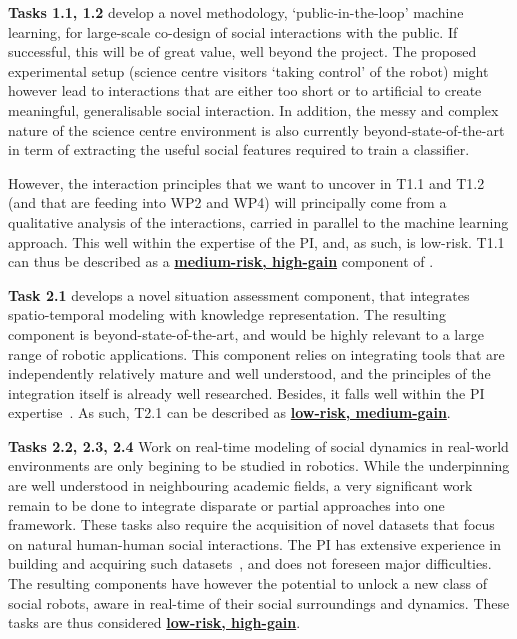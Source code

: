 \begin{rewrite}

\textbf{Tasks 1.1, 1.2} develop a novel methodology, `public-in-the-loop' machine
learning, for large-scale co-design of social interactions with the public. If
successful, this will be of great value, well beyond the project. The
proposed experimental setup (science centre visitors `taking control' of the robot)
might however lead to interactions that are either too short or to artificial to
create meaningful, generalisable social interaction. In addition, the messy and
complex nature of the science centre environment is also currently beyond-state-of-the-art
in term of extracting the useful social features required to train a classifier.

However, the interaction principles that we want to uncover in T1.1 and T1.2
(and that are feeding into WP2 and WP4) will principally come from a qualitative
analysis of the interactions, carried in parallel to the machine learning
approach. This well within the expertise of the PI, and, as such, is low-risk.
T1.1 can thus be described as a \ul{\bf medium-risk, high-gain} component of
\project.

\vspace{1em}

\textbf{Task 2.1} develops a novel situation assessment component, that
integrates spatio-temporal modeling with knowledge representation. The resulting
component is beyond-state-of-the-art, and would be highly relevant to a large range
of robotic applications. This component relies on integrating tools that are
independently relatively mature and well understood, and the principles of the
integration itself is already well researched. Besides, it falls well within the
PI
expertise~\cite{lemaignan2018underworlds,sallami2019simulation,lemaignan2010oro}.
As such, T2.1 can be described as \ul{\bf low-risk, medium-gain}.

\textbf{Tasks 2.2, 2.3, 2.4} Work on real-time modeling of social dynamics in
real-world environments are only begining to be studied in robotics. While the
underpinning are well understood in neighbouring academic fields, a very
significant work remain to be done to integrate disparate or partial approaches
into one framework. These tasks also require the acquisition of novel datasets
that focus on natural human-human social interactions. The PI has extensive
experience in building and acquiring such
datasets~\cite{lemaignan2018pinsoro,sallami2020unexpected}, and does not
foreseen major difficulties. The resulting components have however the potential
to unlock a new class of social robots, aware in real-time of their social
surroundings and dynamics.  These tasks are thus considered \ul{\bf low-risk,
high-gain}.


\end{rewrite}
